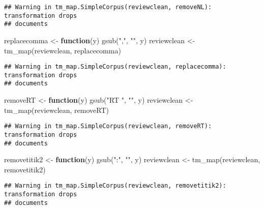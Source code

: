 \documentclass[
]{article}
\newenvironment{Shaded}{\begin{snugshade}}{\end{snugshade}}
\newcommand{\ControlFlowTok}[1]{\textcolor[rgb]{0.13,0.29,0.53}{\textbf{#1}}}
\newcommand{\FunctionTok}[1]{\textcolor[rgb]{0.00,0.00,0.00}{#1}}
\newcommand{\NormalTok}[1]{#1}
\newcommand{\OtherTok}[1]{\textcolor[rgb]{0.56,0.35,0.01}{#1}}
\newcommand{\StringTok}[1]{\textcolor[rgb]{0.31,0.60,0.02}{#1}}
\begin{document}
\begin{verbatim}
## Warning in tm_map.SimpleCorpus(reviewclean, removeNL): transformation drops
## documents
\end{verbatim}

\begin{Shaded}
\begin{Highlighting}[]
\NormalTok{replacecomma }\OtherTok{\textless{}{-}} \ControlFlowTok{function}\NormalTok{(y) }\FunctionTok{gsub}\NormalTok{(}\StringTok{","}\NormalTok{, }\StringTok{""}\NormalTok{, y)}
\NormalTok{reviewclean }\OtherTok{\textless{}{-}} \FunctionTok{tm\_map}\NormalTok{(reviewclean, replacecomma)}
\end{Highlighting}
\end{Shaded}

\begin{verbatim}
## Warning in tm_map.SimpleCorpus(reviewclean, replacecomma): transformation drops
## documents
\end{verbatim}

\begin{Shaded}
\begin{Highlighting}[]
\NormalTok{removeRT }\OtherTok{\textless{}{-}} \ControlFlowTok{function}\NormalTok{(y) }\FunctionTok{gsub}\NormalTok{(}\StringTok{"RT "}\NormalTok{, }\StringTok{""}\NormalTok{, y)}
\NormalTok{reviewclean }\OtherTok{\textless{}{-}} \FunctionTok{tm\_map}\NormalTok{(reviewclean, removeRT)}
\end{Highlighting}
\end{Shaded}

\begin{verbatim}
## Warning in tm_map.SimpleCorpus(reviewclean, removeRT): transformation drops
## documents
\end{verbatim}

\begin{Shaded}
\begin{Highlighting}[]
\NormalTok{removetitik2 }\OtherTok{\textless{}{-}} \ControlFlowTok{function}\NormalTok{(y) }\FunctionTok{gsub}\NormalTok{(}\StringTok{":"}\NormalTok{, }\StringTok{""}\NormalTok{, y)}
\NormalTok{reviewclean }\OtherTok{\textless{}{-}} \FunctionTok{tm\_map}\NormalTok{(reviewclean, removetitik2)}
\end{Highlighting}
\end{Shaded}

\begin{verbatim}
## Warning in tm_map.SimpleCorpus(reviewclean, removetitik2): transformation drops
## documents
\end{verbatim}
\end{document}
